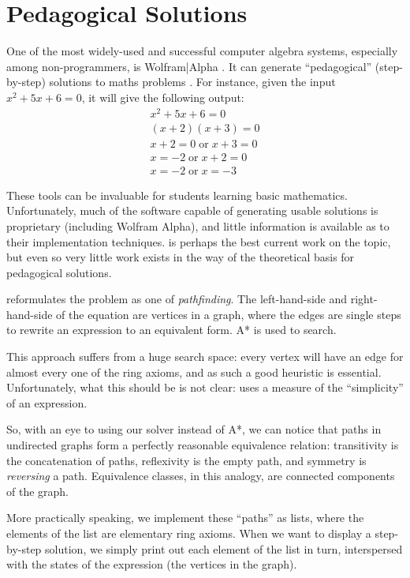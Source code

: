 \documentclass[acmsmall,review,anonymous]{acmart}\settopmatter{printfolios=true,printccs=false,printacmref=false}
\begin{document}
\section{Pedagogical Solutions}
One of the most widely-used and successful computer algebra systems, especially
among non-programmers, is Wolfram|Alpha
\cite{wolfram_research_inc._wolframalpha_2019}. It can generate ``pedagogical''
(step-by-step) solutions to maths
problems \cite{the_development_team_step-by-step_2009}. For instance, given the
input \(x^2 + 5 x + 6 = 0\), it will give the following output:
\begin{align*}
  x^2 + 5x + 6   = 0 \\
  (x + 2)(x + 3) = 0 \\
  x + 2 = 0   \; \text{or} \; x + 3 = 0 \\
  x     = -2  \; \text{or} \; x + 2 = 0 \\
  x     = -2  \; \text{or} \; x     = -3
\end{align*}

These tools can be invaluable for students learning basic mathematics.
Unfortunately, much of the software capable of generating usable solutions is
proprietary (including Wolfram Alpha), and little information is available as to
their implementation techniques.\cite{lioubartsev_constructing_2016} is perhaps
the best current work on the topic, but even so very little work exists in the
way of the theoretical basis for pedagogical solutions.

\citet{lioubartsev_constructing_2016} reformulates the problem as one of
\emph{pathfinding}. The left-hand-side and right-hand-side of the equation are
vertices in a graph, where the edges are single steps to rewrite an expression
to an equivalent form. A* is used to search.

This approach suffers from a huge search space: every vertex will have an edge
for almost every one of the ring axioms, and as such a good heuristic is
essential. Unfortunately, what this should be is not
clear: \citet{lioubartsev_constructing_2016} uses a measure of the ``simplicity''
of an expression.

So, with an eye to using our solver instead of A*, we can notice that paths in
undirected graphs form a perfectly reasonable equivalence relation: transitivity
is the concatenation of paths, reflexivity is the empty path, and symmetry is
\emph{reversing} a path. Equivalence classes, in this analogy, are connected
components of the graph.

More practically speaking, we implement these ``paths'' as lists, where the
elements of the list are elementary ring axioms. When we want to display a
step-by-step solution, we simply print out each element of the list in turn,
interspersed with the states of the expression (the vertices in the graph).
\begin{multicols}{2}
\end{multicols}
\end{document}
